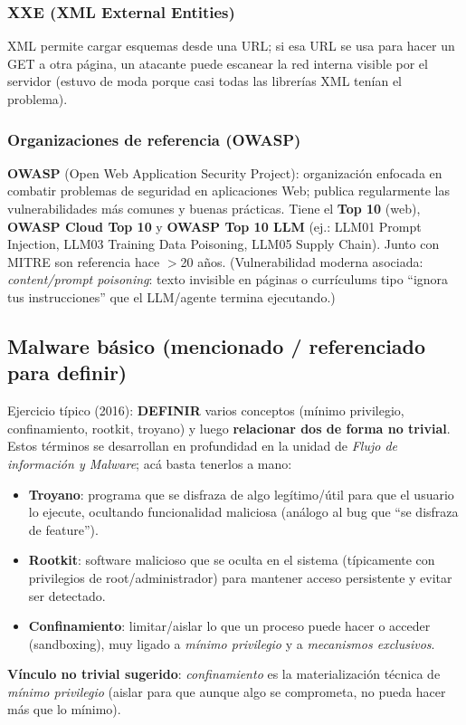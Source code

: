 \documentclass[../main.tex]{subfiles}
\begin{document}
\subsubsection{XXE (XML External Entities)}
XML permite cargar esquemas desde una URL; si esa URL se usa para hacer un GET a otra página, un atacante puede escanear la red interna visible por el servidor (estuvo de moda porque casi todas las librerías XML tenían el problema).

\subsubsection{Organizaciones de referencia (OWASP)}
\textbf{OWASP} (Open Web Application Security Project): organización enfocada en combatir problemas de seguridad en aplicaciones Web; publica regularmente las vulnerabilidades más comunes y buenas prácticas. Tiene el \textbf{Top 10} (web), \textbf{OWASP Cloud Top 10} y \textbf{OWASP Top 10 LLM} (ej.: LLM01 Prompt Injection, LLM03 Training Data Poisoning, LLM05 Supply Chain). Junto con MITRE son referencia hace $>$20 años. (Vulnerabilidad moderna asociada: \emph{content/prompt poisoning}: texto invisible en páginas o currículums tipo ``ignora tus instrucciones'' que el LLM/agente termina ejecutando.)

\subsection{Malware básico (mencionado / referenciado para definir)}

\begin{examen}
Ejercicio típico (2016): \textbf{DEFINIR} varios conceptos (mínimo privilegio, confinamiento, rootkit, troyano) y luego \textbf{relacionar dos de forma no trivial}. Estos términos se desarrollan en profundidad en la unidad de \emph{Flujo de información y Malware}; acá basta tenerlos a mano:
\begin{itemize}
  \item \textbf{Troyano}: programa que se disfraza de algo legítimo/útil para que el usuario lo ejecute, ocultando funcionalidad maliciosa (análogo al bug que ``se disfraza de feature'').
  \item \textbf{Rootkit}: software malicioso que se oculta en el sistema (típicamente con privilegios de root/administrador) para mantener acceso persistente y evitar ser detectado.
  \item \textbf{Confinamiento}: limitar/aislar lo que un proceso puede hacer o acceder (sandboxing), muy ligado a \emph{mínimo privilegio} y a \emph{mecanismos exclusivos}.
\end{itemize}
\textbf{Vínculo no trivial sugerido}: \emph{confinamiento} es la materialización técnica de \emph{mínimo privilegio} (aislar para que aunque algo se comprometa, no pueda hacer más que lo mínimo).
\end{examen}
\end{document}
